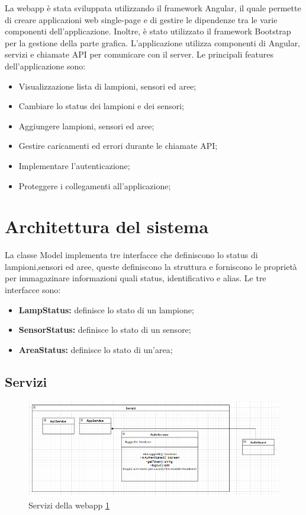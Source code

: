 La webapp è stata sviluppata utilizzando il framework Angular, il quale permette di creare applicazioni web single-page e di gestire le dipendenze tra le varie componenti dell'applicazione. Inoltre, è stato utilizzato il framework Bootstrap per la gestione della parte grafica. L'applicazione utilizza componenti di Angular, servizi e chiamate API per comunicare con il server. Le principali features dell'applicazione sono:
\begin{itemize}
    \item Visualizzazione lista di lampioni, sensori ed aree;
    \item Cambiare lo status dei lampioni e dei sensori;
    \item Aggiungere lampioni, sensori ed aree;
    \item Gestire caricamenti ed errori durante le chiamate API;
    \item Implementare l'autenticazione;
    \item Proteggere i collegamenti all'applicazione; 
\end{itemize} 

\section{Architettura del sistema}

La classe Model implementa tre interfacce che definiscono lo status di lampioni,sensori ed aree, queste definiscono la struttura e forniscono le proprietà per immagazinare informazioni quali status, identificativo e alias. Le tre interfacce sono:
\begin{itemize}
    \item \textbf{LampStatus:} definisce lo stato di un lampione;
    \item \textbf{SensorStatus:} definisce lo stato di un sensore;
    \item \textbf{AreaStatus:} definisce lo stato di un'area;
\end{itemize}

\subsection{Servizi}

\begin{figure}[h]
    \centering
    \includegraphics[width=\textwidth]{img/services_webapp.png}
    \caption{Servizi della webapp \ref{fig:services_webapp}}
    \label{fig:services_webapp}
\end{figure}

